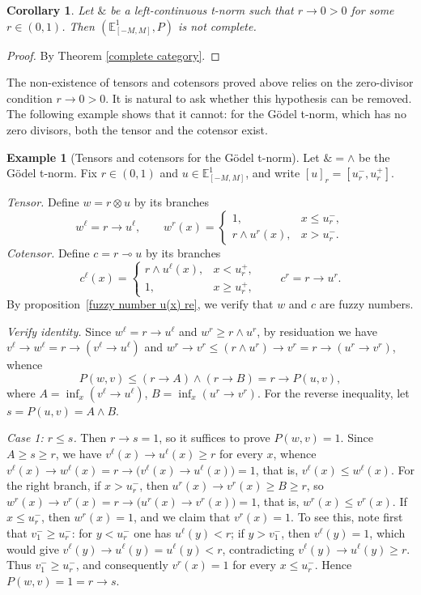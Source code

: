 \documentclass[preprint,3p,times]{elsarticle}
\theoremstyle{plain}
\newtheorem{cor}[thm]{Corollary}
\theoremstyle{definition}
\newtheorem{exmp}[thm]{Example}
\numberwithin{equation}{section}
\begin{document}
\begin{cor}
	Let \(\&\) be a left-continuous t-norm such that \(r\to0>0\) for some
\(r\in(0,1)\). Then
\((\mathbb E^1_{[-M,M]},P)\) is not complete.
\end{cor}
\begin{proof}
    By Theorem \ref{complete category}.
\end{proof}
The non-existence of tensors and cotensors proved above relies on the
zero-divisor condition \(r\to0>0\). It is natural to ask whether this
hypothesis can be removed. The following example shows that it cannot: for
the Gödel t-norm, which has no zero divisors, both the tensor and the
cotensor exist.
\begin{exmp}[Tensors and cotensors for the Gödel t-norm]\label{ex:Godel-tensor}
Let \(\&=\wedge\) be the Gödel t-norm.
Fix \(r\in(0,1)\) and \(u\in\mathbb E^1_{[-M,M]}\), and write
\([u]_r=[u^-_r,u^+_r]\).

\emph{Tensor.} Define \(w=r\otimes u\) by its branches
\[
w^\ell=r\to u^\ell,\qquad
w^r(x)=\begin{cases}1,&x\le u^-_r,\\r\wedge u^r(x),&x>u^-_r.\end{cases}
\]
\emph{Cotensor.} Define \(c=r\multimap u\) by its branches
\[
c^\ell(x)=\begin{cases}r\wedge u^\ell(x),&x<u^+_r,\\1,&x\ge u^+_r,\end{cases}
\qquad
c^r=r\to u^r.
\]
 By proposition~\ref{fuzzy number u(x) re}, we verify that \(w\) and \(c\) are fuzzy numbers.

\emph{Verify identity.} Since \(w^\ell=r\to u^\ell\) and
\(w^r\ge r\wedge u^r\), by residuation we have
\(v^\ell\to w^\ell=r\to(v^\ell\to u^\ell)\) and
\(w^r\to v^r\le(r\wedge u^r)\to v^r=r\to(u^r\to v^r)\), whence
\[
P(w,v)\le(r\to A)\wedge(r\to B)=r\to P(u,v),
\]
where \(A=\inf_x(v^\ell\to u^\ell)\), \(B=\inf_x(u^r\to v^r)\). For the reverse inequality, let \(s=P(u,v)=A\wedge B\).

\emph{Case 1: \(r\le s\).} Then \(r\to s=1\), so it suffices to prove
\(P(w,v)=1\). Since \(A\ge s\ge r\), we have \(v^\ell(x)\to u^\ell(x)\ge r\)
for every \(x\), whence
\(v^\ell(x)\to w^\ell(x)=r\to\bigl(v^\ell(x)\to u^\ell(x)\bigr)=1\), that is,
\(v^\ell(x)\le w^\ell(x)\). For the right branch, if \(x>u^-_r\), then
\(u^r(x)\to v^r(x)\ge B\ge r\), so
\(w^r(x)\to v^r(x)=r\to\bigl(u^r(x)\to v^r(x)\bigr)=1\), that is,
\(w^r(x)\le v^r(x)\). If \(x\le u^-_r\), then \(w^r(x)=1\), and we claim that
\(v^r(x)=1\). To see this, note first that \(v_1^-\ge u^-_r\): for \(y<u^-_r\)
one has \(u^\ell(y)<r\); if \(y>v_1^-\), then \(v^\ell(y)=1\), which would give
\(v^\ell(y)\to u^\ell(y)=u^\ell(y)<r\), contradicting
\(v^\ell(y)\to u^\ell(y)\ge r\). Thus \(v_1^-\ge u^-_r\), and consequently
\(v^r(x)=1\) for every \(x\le u^-_r\). Hence \(P(w,v)=1=r\to s\).


\end{exmp}
\end{document}

